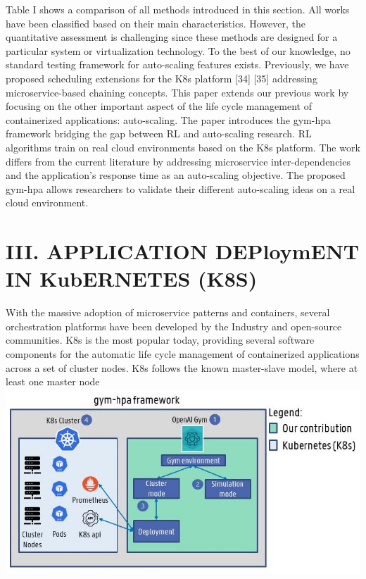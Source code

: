 \documentclass[10pt]{article}
\begin{document}
Table I shows a comparison of all methods introduced in this section. All works have been classified based on their main characteristics. However, the quantitative assessment is challenging since these methods are designed for a particular system or virtualization technology. To the best of our knowledge, no standard testing framework for auto-scaling features exists. Previously, we have proposed scheduling extensions for the K8s platform [34] [35] addressing microservice-based chaining concepts. This paper extends our previous work by focusing on the other important aspect of the life cycle management of containerized applications: auto-scaling. The paper introduces the gym-hpa framework bridging the gap between RL and auto-scaling research. RL algorithms train on real cloud environments based on the K8s platform. The work differs from the current literature by addressing microservice inter-dependencies and the application's response time as an auto-scaling objective. The proposed gym-hpa allows researchers to validate their different auto-scaling ideas on a real cloud environment.

\section*{III. APPLICATION DEPloymENT IN KubERNETES (K8S)}
With the massive adoption of microservice patterns and containers, several orchestration platforms have been developed by the Industry and open-source communities. K8s is the most popular today, providing several software components for the automatic life cycle management of containerized applications across a set of cluster nodes. K8s follows the known master-slave model, where at least one master node\\
\includegraphics[max width=\textwidth, center]{2024_11_17_21ad14b6196e5740bf69g-4}
\end{document}
